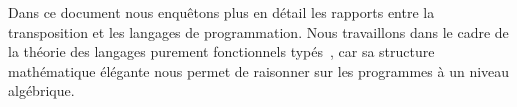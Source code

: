 Dans ce document nous enquêtons plus en détail les rapports entre la
transposition et les langages de programmation. Nous travaillons dans
le cadre de la théorie des langages purement fonctionnels
typés~\cite{pierce}, car sa structure mathématique élégante nous
permet de raisonner sur les programmes à un niveau algébrique.

\paragraph*{}




